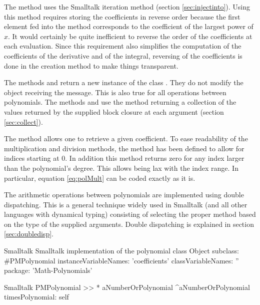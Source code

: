The method  uses the Smalltalk iteration method  (\cf section \ref{sec:injectinto}). Using this
method requires storing the coefficients in reverse order because
the first element fed into the method 
corresponds to the coefficient of the largest power of $x$. It
would certainly be quite inefficient to reverse the order of the
coefficients at each evaluation. Since this requirement also
simplifies the computation of the coefficients of the derivative
and of the integral, reversing of the coefficients is done in the
creation method to make things transparent.

The methods  and  return a new
instance of the class . They do not modify the
object receiving the message. This is also true for all operations
between polynomials. The methods  and  use the method  returning a collection of
the values returned by the supplied block closure at each argument
(\cf section \ref{sec:collect}).

The method  allows one to retrieve a given coefficient.
To ease readability of the multiplication and division methods,
the method  has been defined to allow for indices
starting at 0. In addition this method returns zero for any index
larger than the polynomial's degree. This allows being lax with
the index range. In particular, equation \ref{eq:polMult} can be
coded exactly as it is.

The arithmetic operations between polynomials are implemented
using double dispatching. This is a general technique widely used
in Smalltalk (and all other languages with dynamical typing)
consisting of selecting the proper method based on the type of the
supplied arguments. Double dispatching is explained in section
\ref{sec:doubledisp}.


\begin{listing}[label=lst:polynomial]{Smalltalk}
{Smalltalk implementation of the polynomial class}
Object subclass: #PMPolynomial
   instanceVariableNames: 'coefficients'
   classVariableNames: ''
   package: 'Math-Polynomials'
\end{listing}

\begin{displaycode}{Smalltalk}
PMPolynomial >> * aNumberOrPolynomial
   ^aNumberOrPolynomial timesPolynomial: self
\end{displaycode}

